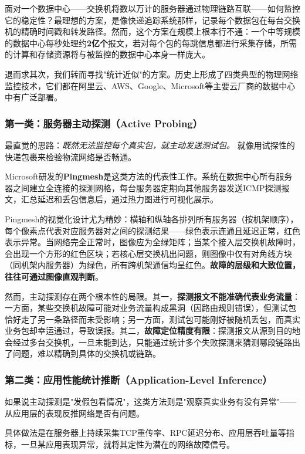 面对一个数据中心——交换机将数以万计的服务器通过物理链路互联——如何监控它的稳定性？最理想的方案，是像快递追踪系统那样，记录每个数据包在每台交换机的精确时间戳和转发路径。然而，这个方案在规模上根本行不通：一个中等规模的数据中心每秒处理约\textbf{2亿个}报文，若对每个包的每跳信息都进行采集存储，所需的计算和存储资源将与被监控的数据中心本身一样庞大。

退而求其次，我们转而寻找"统计近似"的方案。历史上形成了四类典型的物理网络监控技术，它们都在阿里云、AWS、Google、Microsoft等主要云厂商的数据中心中有广泛部署。

\subsubsection{第一类：服务器主动探测（Active Probing）}

最直觉的思路：\emph{既然无法监控每个真实包，就主动发送测试包。} 就像用试探性的快递包裹来检验物流网络是否畅通。

Microsoft研发的\textbf{Pingmesh}是这类方法的代表性工作。系统在数据中心所有服务器之间建立全连接的探测网格，每台服务器定期向其他服务器发送ICMP探测报文，汇总延迟和丢包信息后，通过热力图进行可视化展示。

Pingmesh的视觉化设计尤为精妙：横轴和纵轴各排列所有服务器（按机架顺序），每个像素点代表对应服务器对之间的探测结果——绿色表示连通且延迟正常，红色表示异常。当网络完全正常时，图像应为全绿矩阵；当某个接入层交换机故障时，会出现一个方形的红色区块；若核心层交换机出问题，则图像中仅有对角线方块（同机架内服务器）为绿色，所有跨机架通信均呈红色。\textbf{故障的层级和大致位置，往往可通过图像直观判断}。

然而，主动探测存在两个根本性的局限。其一，\textbf{探测报文不能准确代表业务流量}：一方面，某些交换机故障可能对业务流量构成黑洞（因路由规则错误），但测试包恰好走了另一条路径而未受影响；另一方面，测试包可能刚好被随机丢包，而真实业务包却幸运通过，导致误报。其二，\textbf{故障定位精度有限}：探测报文从源到目的地会经过多台交换机，一旦未能到达，只能通过统计多个失败探测来猜测哪段链路出了问题，难以精确到具体的交换机或链路。

\subsubsection{第二类：应用性能统计推断（Application-Level Inference）}

如果说主动探测是"发假包看情况"，这类方法则是"观察真实业务有没有异常"——从应用层的表现反推网络是否有问题。

具体做法是在服务器上持续采集TCP重传率、RPC延迟分布、应用层吞吐量等指标，一旦某应用表现异常，就将其定性为潜在的网络故障信号。

